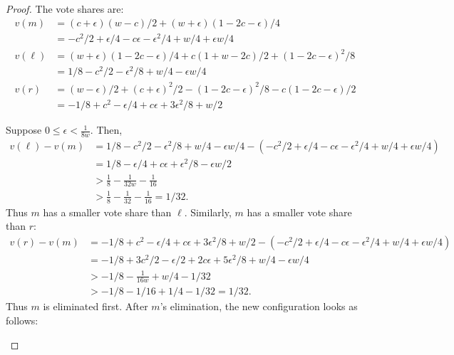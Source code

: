 \documentclass{article}
\theoremstyle{theorem}
\theoremstyle{definition}
\begin{document}
\begin{proof}
The vote shares are:
\begin{align*}
  v(m)   &= (c +\epsilon)(w-c)/2 + (w+\epsilon)(1-2c-\epsilon)/4\\
  &= -c^2/2 + \epsilon/4 - c \epsilon - \epsilon^2/4 + w/4 + \epsilon w/4 \\[0.5em]
  v(\ell)   &= (w+\epsilon)(1-2c-\epsilon)/4 + c(1 + w -2c)/2 + (1-2c - \epsilon)^2/8\\
  &= 1/8 - c^2/2 - \epsilon^2/8 + w/4 - \epsilon w/4 \\[0.5em]
    v(r)   &= (w - \epsilon)/2 + (c+\epsilon)^2 / 2 - (1-2c - \epsilon)^2/8 - c(1-2c-\epsilon)/2\\
    &= -1/8 + c^2 - \epsilon/4 + c \epsilon + 3 \epsilon^2/8 + w/2
\end{align*}

Suppose $0 \le \epsilon < \frac{1}{8w}$. Then,
\begin{align*}
  v(\ell) - v(m) &= 1/8 - c^2/2 - \epsilon^2/8 + w/4 - \epsilon w/4 - (-c^2/2 + \epsilon/4 - c \epsilon - \epsilon^2/4 + w/4 + \epsilon w/4)\\
  &= 1/8 - \epsilon/4 + c \epsilon + \epsilon^2/8 - \epsilon w/2\\
  &> \frac{1}{8} - \frac{1}{32w} - \frac{1}{16}\\
  &> \frac{1}{8} - \frac{1}{32} - \frac{1}{16} = 1/32.
  \end{align*}
  Thus $m$ has a smaller vote share than $\ell$. Similarly, $m$ has a smaller vote share than $r$:
   \begin{align*}
  v(r) - v(m) &= -1/8 + c^2 - \epsilon/4 + c \epsilon + 3 \epsilon^2/8 + w/2 - (-c^2/2 + \epsilon/4 - c \epsilon - \epsilon^2/4 + w/4 + \epsilon w/4)\\
  &= -1/8 + 3 c^2/2 - \epsilon/2 + 2 c \epsilon + 5 \epsilon^2/8 + w/4 - \epsilon w/4 \\
  &> -1/8 - \frac{1}{16w} + w/4 - 1/32\\
  &> - 1/8 - 1/16 + 1/4 - 1/32 = 1/32.
  \end{align*}
  Thus $m$ is eliminated first. After $m$'s elimination, the new configuration looks as follows:
  
\begin{center}
\end{center}
\end{proof}
\end{document}
